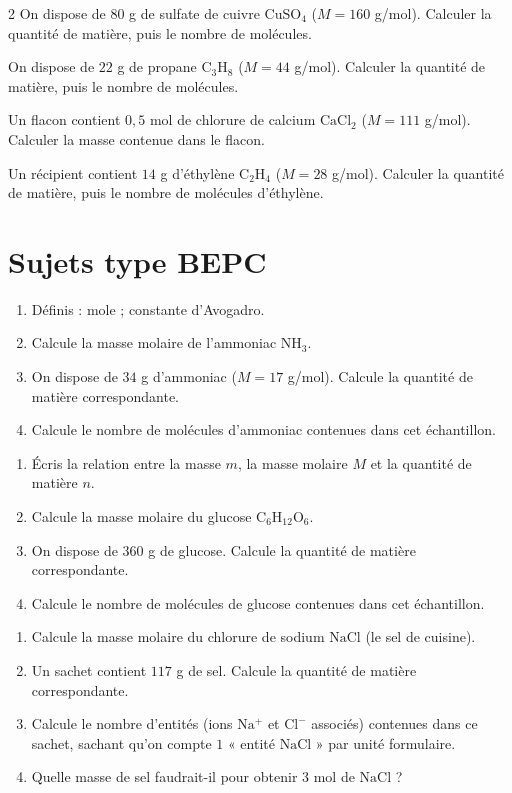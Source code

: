 \begin{multicols}{2}
\exo{} On dispose de $80$ g de sulfate de cuivre $\mathrm{CuSO_4}$ ($M=160$
g/mol). Calculer la quantité de matière, puis le nombre de molécules.

\exo{} On dispose de $22$ g de propane $\mathrm{C_3H_8}$ ($M=44$ g/mol). Calculer
la quantité de matière, puis le nombre de molécules.

\exo{} Un flacon contient $0{,}5$ mol de chlorure de calcium $\mathrm{CaCl_2}$
($M=111$ g/mol). Calculer la masse contenue dans le flacon.

\exo{} Un récipient contient $14$ g d'éthylène $\mathrm{C_2H_4}$ ($M=28$
g/mol). Calculer la quantité de matière, puis le nombre de molécules d'éthylène.

\end{multicols}

\section{Sujets type BEPC}

\begin{enumerate}[label=\arabic*)]
\item Définis : mole ; constante d'Avogadro.
\item Calcule la masse molaire de l'ammoniac $\mathrm{NH_3}$.
\item On dispose de $34$ g d'ammoniac ($M=17$ g/mol). Calcule la quantité de matière
correspondante.
\item Calcule le nombre de molécules d'ammoniac contenues dans cet échantillon.
\end{enumerate}

\begin{enumerate}[label=\arabic*)]
\item Écris la relation entre la masse $m$, la masse molaire $M$ et la quantité de matière
$n$.
\item Calcule la masse molaire du glucose $\mathrm{C_6H_{12}O_6}$.
\item On dispose de $360$ g de glucose. Calcule la quantité de matière correspondante.
\item Calcule le nombre de molécules de glucose contenues dans cet échantillon.
\end{enumerate}

\begin{enumerate}[label=\arabic*)]
\item Calcule la masse molaire du chlorure de sodium $\mathrm{NaCl}$ (le sel de cuisine).
\item Un sachet contient $117$ g de sel. Calcule la quantité de matière correspondante.
\item Calcule le nombre d'entités (ions $\mathrm{Na^+}$ et $\mathrm{Cl^-}$ associés)
contenues dans ce sachet, sachant qu'on compte $1$ « entité $\mathrm{NaCl}$ » par unité
formulaire.
\item Quelle masse de sel faudrait-il pour obtenir $3$ mol de $\mathrm{NaCl}$ ?
\end{enumerate}

